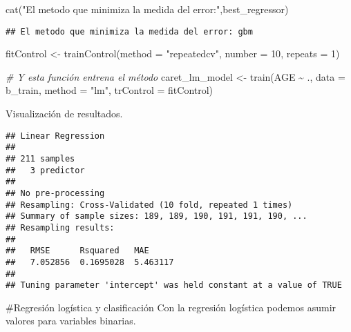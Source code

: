 \documentclass[
]{article}
\newenvironment{Shaded}{\begin{snugshade}}{\end{snugshade}}
\newcommand{\AttributeTok}[1]{\textcolor[rgb]{0.77,0.63,0.00}{#1}}
\newcommand{\CommentTok}[1]{\textcolor[rgb]{0.56,0.35,0.01}{\textit{#1}}}
\newcommand{\DecValTok}[1]{\textcolor[rgb]{0.00,0.00,0.81}{#1}}
\newcommand{\FunctionTok}[1]{\textcolor[rgb]{0.00,0.00,0.00}{#1}}
\newcommand{\NormalTok}[1]{#1}
\newcommand{\OtherTok}[1]{\textcolor[rgb]{0.56,0.35,0.01}{#1}}
\newcommand{\SpecialCharTok}[1]{\textcolor[rgb]{0.00,0.00,0.00}{#1}}
\newcommand{\StringTok}[1]{\textcolor[rgb]{0.31,0.60,0.02}{#1}}
\begin{document}
\begin{Shaded}
\begin{Highlighting}[]
\FunctionTok{cat}\NormalTok{(}\StringTok{"El metodo que minimiza la medida del error:"}\NormalTok{,best\_regressor)}
\end{Highlighting}
\end{Shaded}

\begin{verbatim}
## El metodo que minimiza la medida del error: gbm
\end{verbatim}

\begin{Shaded}
\begin{Highlighting}[]
\NormalTok{fitControl }\OtherTok{\textless{}{-}} \FunctionTok{trainControl}\NormalTok{(}\AttributeTok{method =} \StringTok{"repeatedcv"}\NormalTok{,}
                           \AttributeTok{number =} \DecValTok{10}\NormalTok{,}
                           \AttributeTok{repeats =} \DecValTok{1}\NormalTok{)}

\CommentTok{\# Y esta función entrena el método}
\NormalTok{caret\_lm\_model }\OtherTok{\textless{}{-}} \FunctionTok{train}\NormalTok{(AGE }\SpecialCharTok{\textasciitilde{}}\NormalTok{ ., }
                        \AttributeTok{data =}\NormalTok{ b\_train, }
                        \AttributeTok{method =} \StringTok{"lm"}\NormalTok{,}
                        \AttributeTok{trControl =}\NormalTok{ fitControl)}
\end{Highlighting}
\end{Shaded}

Visualización de resultados.

\begin{Shaded}
\end{Shaded}

\begin{verbatim}
## Linear Regression 
## 
## 211 samples
##   3 predictor
## 
## No pre-processing
## Resampling: Cross-Validated (10 fold, repeated 1 times) 
## Summary of sample sizes: 189, 189, 190, 191, 191, 190, ... 
## Resampling results:
## 
##   RMSE      Rsquared   MAE     
##   7.052856  0.1695028  5.463117
## 
## Tuning parameter 'intercept' was held constant at a value of TRUE
\end{verbatim}

\#Regresión logística y clasificación Con la regresión logística podemos
asumir valores para variables binarias.
\end{document}
